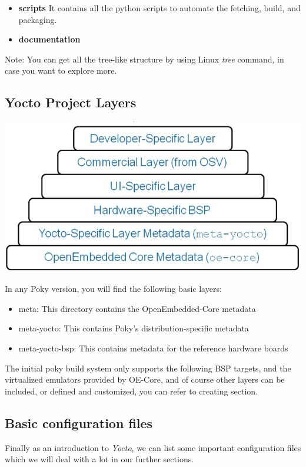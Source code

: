 \documentclass{article}
\begin{document}
\begin{itemize}
  \item \textbf{scripts}
  It contains all the python scripts to automate the fetching, build, and packaging. 
  \item \textbf{documentation}
\end{itemize}

Note: You can get all the tree-like structure by using Linux \textit{tree} command, in case you want to explore more.

\subsection{Yocto Project Layers}
\label{yocto-layers}
\begin{center}
  \includegraphics[scale=0.40]{./resources/img/Yocto-Layers.jpeg}
\end{center}

In any Poky version, you will find the following basic layers:
\begin{itemize}
    \item meta: This directory contains the OpenEmbedded-Core metadata
    \item meta-yocto: This contains Poky's distribution-specific metadata
    \item meta-yocto-bsp: This contains metadata for the reference hardware boards
\end{itemize}

The initial poky build system only supports the following BSP targets, and the virtualized emulators provided by OE-Core, and of course other layers can be included, or defined and customized, you can refer to creating  section.



\subsection{Basic configuration files}
Finally as an introduction to \textit{Yocto}, we can list some important configuration files which we will deal with a lot in our further sections.
\end{document}
